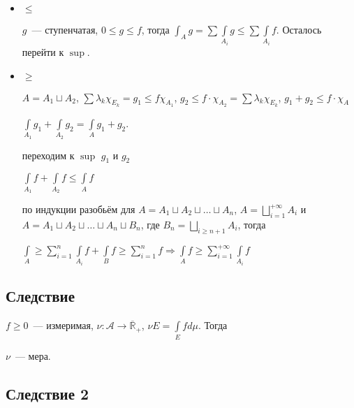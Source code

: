 \documentclass{article}
\begin{document}
            \begin{itemize}
            
                \item $\leqslant$
                
                    $g$~--- ступенчатая, $0 \leqslant g \leqslant f$, тогда $\int_A g = \sum \int\limits_{A_i} g \leqslant \sum \int\limits_{A_i} f$. Осталось перейти к $\sup$.
                    
                \item $\geqslant$
                
                    $A = A_1 \sqcup A_2$, $\sum \lambda_k \chi_{E_k} = g_1 \leqslant f \chi_{A_1}$, $g_2 \leqslant f \cdot \chi_{A_2} = \sum \lambda_k \chi_{E_k}$, $g_1 + g_2 \leqslant f \cdot \chi_{A}$
                    
                    $\int\limits_{A_1} g_1 + \int\limits_{A_2} g_2 = \int\limits_{A} g_1 + g_2$.
                    
                    переходим к $\sup$ $g_1$ и $g_2$
                    
                    $\int\limits_{A_1} f + \int\limits_{A_2} f \leqslant \int\limits_{A} f$
                    
                    по индукции разобьём для $A = A_1 \sqcup A_2 \sqcup \ldots \sqcup A_n$, $A = \bigsqcup\limits^{+\infty}_{i = 1} A_i$ и $A = A_1 \sqcup A_2 \sqcup \ldots \sqcup A_n \sqcup B_n$, где $B_n = \bigsqcup\limits_{i \geqslant n + 1} A_i$, тогда
                    
                    $\int\limits_{A} \geqslant \sum\limits^n_{i = 1} \int\limits_{A_i} f + \int\limits_{B} f \geqslant \sum\limits^n_{i = 1} f \Rightarrow \int\limits_{A}f \geqslant \sum\limits^{+\infty}_{i = 1} \int\limits_{A_i} f$
                    
            \end{itemize}
            
    \subsection{Следствие}
    
        $f \geqslant 0$~--- измеримая, $\nu : \mathcal{A} \rightarrow \overline{\mathbb{R}}_+$, $\nu E = \int\limits_{E} f d \mu$. Тогда
        
            $\nu$~--- мера.
            
    \subsection{Следствие 2}
    
\end{document}
